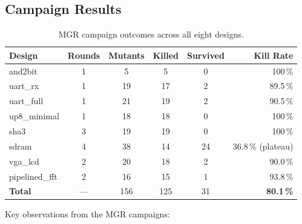 \documentclass[11pt,a4paper]{article}
\begin{document}
\subsection{Campaign Results}

\begin{table}[H]
\centering
\caption{MGR campaign outcomes across all eight designs.}
\label{tab:mgr_results}
\begin{tabular}{lccccr}
\toprule
\textbf{Design} & \textbf{Rounds} & \textbf{Mutants} &
  \textbf{Killed} & \textbf{Survived} & \textbf{Kill Rate} \\
\midrule
and2bit         & 1 & 5   & 5   & 0   & 100\,\% \\
uart\_rx        & 1 & 19  & 17  & 2   & 89.5\,\% \\
uart\_full      & 1 & 21  & 19  & 2   & 90.5\,\% \\
up8\_minimal    & 1 & 18  & 18  & 0   & 100\,\% \\
sha3            & 3 & 19  & 19  & 0   & 100\,\% \\
sdram           & 4 & 38  & 14  & 24  & 36.8\,\% (plateau) \\
vga\_lcd        & 2 & 20  & 18  & 2   & 90.0\,\% \\
pipelined\_fft  & 2 & 16  & 15  & 1   & 93.8\,\% \\
\midrule
\textbf{Total}  & --- & 156 & 125 & 31 & \textbf{80.1\,\%} \\
\bottomrule
\end{tabular}
\end{table}

\noindent Key observations from the MGR campaigns:
\end{document}

